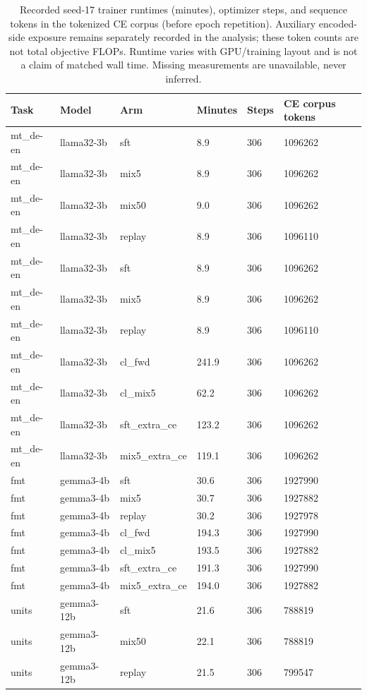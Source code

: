 \begin{table}[t]
\centering\small
\begin{tabular}{llllll}
\toprule
Task & Model & Arm & Minutes & Steps & CE corpus tokens \\
\midrule
mt\_de-en & llama32-3b & sft & 8.9 & 306 & 1096262 \\
mt\_de-en & llama32-3b & mix5 & 8.9 & 306 & 1096262 \\
mt\_de-en & llama32-3b & mix50 & 9.0 & 306 & 1096262 \\
mt\_de-en & llama32-3b & replay & 8.9 & 306 & 1096110 \\
mt\_de-en & llama32-3b & sft & 8.9 & 306 & 1096262 \\
mt\_de-en & llama32-3b & mix5 & 8.9 & 306 & 1096262 \\
mt\_de-en & llama32-3b & replay & 8.9 & 306 & 1096110 \\
mt\_de-en & llama32-3b & cl\_fwd & 241.9 & 306 & 1096262 \\
mt\_de-en & llama32-3b & cl\_mix5 & 62.2 & 306 & 1096262 \\
mt\_de-en & llama32-3b & sft\_extra\_ce & 123.2 & 306 & 1096262 \\
mt\_de-en & llama32-3b & mix5\_extra\_ce & 119.1 & 306 & 1096262 \\
fmt & gemma3-4b & sft & 30.6 & 306 & 1927990 \\
fmt & gemma3-4b & mix5 & 30.7 & 306 & 1927882 \\
fmt & gemma3-4b & replay & 30.2 & 306 & 1927978 \\
fmt & gemma3-4b & cl\_fwd & 194.3 & 306 & 1927990 \\
fmt & gemma3-4b & cl\_mix5 & 193.5 & 306 & 1927882 \\
fmt & gemma3-4b & sft\_extra\_ce & 191.3 & 306 & 1927990 \\
fmt & gemma3-4b & mix5\_extra\_ce & 194.0 & 306 & 1927882 \\
units & gemma3-12b & sft & 21.6 & 306 & 788819 \\
units & gemma3-12b & mix50 & 22.1 & 306 & 788819 \\
units & gemma3-12b & replay & 21.5 & 306 & 799547 \\
\bottomrule
\end{tabular}
\caption{Recorded seed-17 trainer runtimes (minutes), optimizer steps, and sequence tokens in the tokenized CE corpus (before epoch repetition). Auxiliary encoded-side exposure remains separately recorded in the analysis; these token counts are not total objective FLOPs. Runtime varies with GPU/training layout and is not a claim of matched wall time. Missing measurements are unavailable, never inferred.}
\label{tab:preservation-costs}
\end{table}
